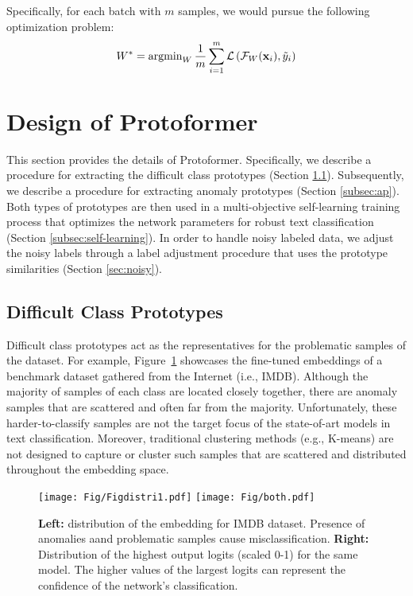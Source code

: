 \documentclass[letterpaper]{article} \usepackage{aaai22}  \usepackage{times}  \usepackage{helvet}  \usepackage{courier}  \usepackage{amsmath,amssymb}
\begin{document}
Specifically, for each batch with $m$ samples, we would pursue the following optimization problem:
\begin{equation}
W^{*}=\operatorname{argmin}_{W} \frac{1}{m}\sum_{i=1}^m \mathcal{L}\left(\mathcal{F}_{W}(\mathbf{x}_i), \Tilde{y}_i \right)
\end{equation}
 \section{Design of Protoformer}
\vspace{-2mm}
\label{section-methodology}
This section provides the details of Protoformer. Specifically, we describe a procedure for extracting the difficult class prototypes (Section \ref{subsec:cp}). Subsequently, we describe a procedure for extracting anomaly prototypes (Section \ref{subsec:ap}). Both types of prototypes are then used in a multi-objective self-learning training process that optimizes the network parameters for robust text classification (Section \ref{subsec:self-learning}).
In order to handle noisy labeled data, we adjust the noisy labels through a label adjustment procedure that uses the prototype similarities (Section \ref{sec:noisy}). 

\subsection{Difficult Class Prototypes}
\label{subsec:cp}
Difficult class prototypes act as the representatives for the problematic samples of the dataset. For example, Figure~\ref{fig:accuracy_improve} showcases the fine-tuned embeddings of a benchmark dataset gathered from the Internet (i.e., IMDB). Although the majority of samples of each class are located closely together, there are anomaly samples that are scattered and often far from the majority. Unfortunately, these harder-to-classify samples are not the target focus of the state-of-art models in text classification. 
Moreover, traditional clustering methods (e.g., K-means) are not designed to capture or cluster such samples that are scattered and distributed throughout the embedding space. 

\begin{figure}[!t]\centering
 {{\texttt{[image: Fig/Figdistri1.pdf]}}}\qquad
 {{\texttt{[image: Fig/both.pdf]} }}\caption{\textbf{Left:} distribution of the embedding for IMDB dataset. Presence of anomalies aand problematic samples cause misclassification. \textbf{Right:} Distribution of the highest output logits (scaled 0-1) for the same model. 
 The higher values of the largest logits can represent the confidence of the network's classification.}
 \label{fig:accuracy_improve}
 \vspace{-5mm}

\end{figure}
\end{document}

